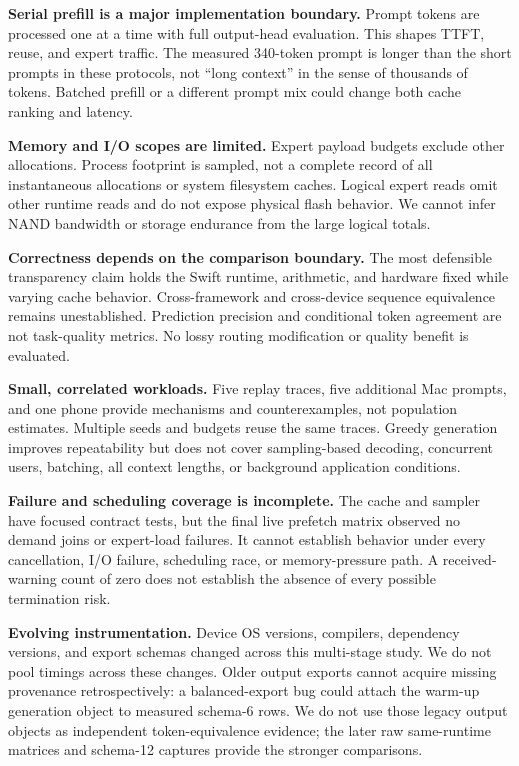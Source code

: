 \documentclass[11pt]{article}
\begin{document}
\textbf{Serial prefill is a major implementation boundary.} Prompt tokens are
processed one at a time with full output-head evaluation. This shapes
TTFT, reuse, and expert traffic. The measured 340-token prompt is longer
than the short prompts in these protocols, not ``long context'' in the
sense of thousands of tokens. Batched prefill or a different prompt mix
could change both cache ranking and latency.

\textbf{Memory and I/O scopes are limited.} Expert payload budgets exclude
other allocations. Process footprint is sampled, not a complete record
of all instantaneous allocations or system filesystem caches. Logical
expert reads omit other runtime reads and do not expose physical flash
behavior. We cannot infer NAND bandwidth or storage endurance from the
large logical totals.

\textbf{Correctness depends on the comparison boundary.} The most defensible
transparency claim holds the Swift runtime, arithmetic, and hardware
fixed while varying cache behavior. Cross-framework and cross-device
sequence equivalence remains unestablished. Prediction precision and
conditional token agreement are not task-quality metrics. No lossy
routing modification or quality benefit is evaluated.

\textbf{Small, correlated workloads.} Five replay traces, five additional
Mac prompts, and one phone provide mechanisms and counterexamples, not
population estimates. Multiple seeds and budgets reuse the same traces.
Greedy generation improves repeatability but does not cover sampling-based
decoding, concurrent users, batching, all context lengths, or background
application conditions.

\textbf{Failure and scheduling coverage is incomplete.} The cache and sampler
have focused contract tests, but the final live prefetch matrix observed
no demand joins or expert-load failures. It cannot establish behavior
under every cancellation, I/O failure, scheduling race, or memory-pressure
path. A received-warning count of zero does not establish the absence
of every possible termination risk.

\textbf{Evolving instrumentation.} Device OS versions, compilers, dependency
versions, and export schemas changed across this multi-stage study.
We do not pool timings across these changes. Older output exports cannot
acquire missing provenance retrospectively: a balanced-export bug could
attach the warm-up generation object to measured schema-6 rows. We do
not use those legacy output objects as independent token-equivalence
evidence; the later raw same-runtime matrices and schema-12 captures
provide the stronger comparisons.
\end{document}
